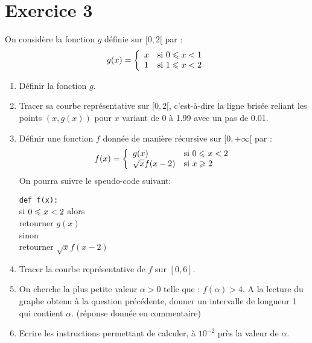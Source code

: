 \documentclass[a4paper,10pt]{article}
\begin{document}
\section*{Exercice 3}
On considère la fonction $g$ définie sur $[0,2[$ par :
\[g(x)=\left\lbrace\begin{array}{lllll}
x&\text{si }0\leqslant x<1\\
1&\text{si }1\leqslant x<2
\end{array}\right.\]
\begin{enumerate}
\item Définir la fonction $g$.
\item Tracer sa courbe représentative sur $[0,2[$, c'est-à-dire la ligne brisée reliant les points $(x,g(x))$ pour $x$ variant de 0 à 1.99 avec un pas de 0.01.
\item Définir une fonction $f$ donnée de manière récursive sur $[0,+\infty[$ par :
\[f(x)=\left\lbrace\begin{array}{lllll}
g(x)&\text{si }0\leqslant x<2\\
\sqrt{x}f(x-2)&\text{si }x\geqslant 2
\end{array}\right.\]
On pourra suivre le speudo-code suivant:
\begin{center}
\begin{minipage}{9cm}
\verb?def f(x):?\\
\hspace*{0.5cm} si $0\leqslant x<2$ alors\\
\hspace*{1cm} retourner $g(x)$\\
\hspace*{0.5cm} sinon\\
\hspace*{1cm} retourner $\sqrt{x}f(x-2)$
\end{minipage}
\end{center}
\item Tracer la courbe représentative de $f$ sur $[0,6]$.
\item On cherche la plus petite valeur $\alpha>0$ telle que : $f(\alpha)>4$. A la lecture du graphe obtenu \` a la question précédente, donner un intervalle de longueur 1 qui contient $\alpha$. (réponse donnée en commentaire)
\item Ecrire les instructions permettant de calculer, à $10^{-2}$ près la valeur de $\alpha$.
\end{enumerate}
\end{document}
